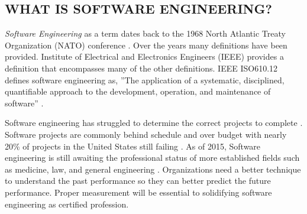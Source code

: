 \documentclass[SDSUThesis.tex]{subfiles}
\begin{document}
\subsection{WHAT IS SOFTWARE ENGINEERING?}
\label{sec:swe}
    \textit{Software Engineering} as a term dates back to the 
    1968 North Atlantic Treaty Organization (NATO) conference \cite{Tsui2013, Naur1969}. Over the 
    years many definitions have been provided.  Institute of Electrical 
    and Electronics Engineers (IEEE) provides a definition that encompasses 
    many of the other definitions.
    IEEE ISO610.12 defines software engineering as, 
    ''The application of a systematic, disciplined, quantifiable approach to the development, operation, and maintenance of software''
    \cite{Ieee1990}.
    
    Software engineering has struggled to determine the correct projects 
    to complete \cite{DeMarco2009}.
    Software projects are commonly behind schedule and over budget \cite{Lehtinen2014, 
    Charette2005,Jorgensen2013,Ichu2012} with nearly 20\% of projects
    in the United States still failing \cite{Emam2008}. 
    As of 2015, Software engineering is 
    still awaiting the professional status of more established fields such
    as medicine, law, and general engineering \cite{Jones2013b}. 
    Organizations need a better
    technique to understand the past performance so they can better 
    predict the future performance.  Proper measurement will be essential
    to solidifying software engineering as certified profession.  
\end{document}
